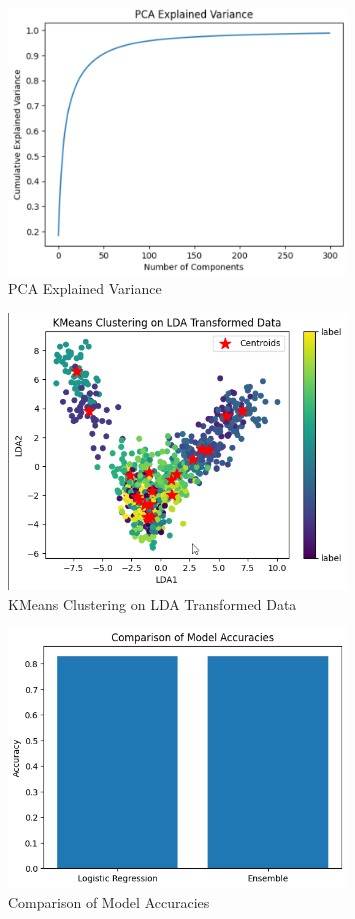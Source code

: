 \documentclass{article}
\begin{document}
\begin{figure}[h]
\centering
\includegraphics[width=0.8\textwidth]{PCA.png}
\caption{PCA Explained Variance}
\label{fig:pca_explained_variance}
\end{figure}

\begin{figure}[h]
\centering
\includegraphics[width=0.8\textwidth]{kmeans with LDA.png}
\caption{KMeans Clustering on LDA Transformed Data}
\label{fig:kmeans_clustering_lda_transformed_data}
\end{figure}

\begin{figure}[h]
\centering
\includegraphics[width=0.8\textwidth]{Comparison Logistic Regression and Ensemble.png}
\caption{Comparison of Model Accuracies}
\label{fig:model_accuracies_comparison}
\end{figure}
\end{document}
